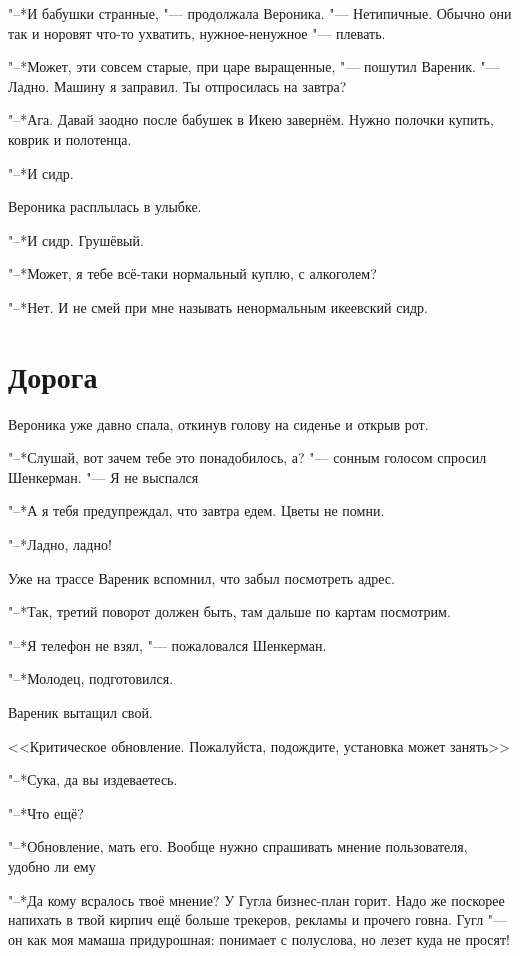 "--*И бабушки странные, "--- продолжала Вероника.
"--- Нетипичные.
Обычно они так и норовят что-то ухватить, нужное-ненужное "--- плевать.

"--*Может, эти совсем старые, при царе выращенные, "--- пошутил Вареник.
"--- Ладно.
Машину я заправил.
Ты отпросилась на завтра?

"--*Ага.
Давай заодно после бабушек в Икею завернём.
Нужно полочки купить, коврик и полотенца.

"--*И сидр.

Вероника расплылась в улыбке.

"--*И сидр.
Грушёвый.

"--*Может, я тебе всё-таки нормальный куплю, с алкоголем?

"--*Нет.
И не смей при мне называть ненормальным икеевский сидр.

\section{Дорога}

Вероника уже давно спала, откинув голову на сиденье и открыв рот.

"--*Слушай, вот зачем тебе это понадобилось, а? "--- сонным голосом спросил Шенкерман.
"--- Я не выспался\ldotst

"--*А я тебя предупреждал, что завтра едем.
Цветы не помни.

"--*Ладно, ладно!

Уже на трассе Вареник вспомнил, что забыл посмотреть адрес.

"--*Так, третий поворот должен быть, там дальше по картам посмотрим.

"--*Я телефон не взял, "--- пожаловался Шенкерман.

"--*Молодец, подготовился.

Вареник вытащил свой.

<<Критическое обновление.
Пожалуйста, подождите, установка может занять\ldotst>>

"--*Сука, да вы издеваетесь.

"--*Что ещё?

"--*Обновление, мать его.
Вообще нужно спрашивать мнение пользователя, удобно ли ему\ldotst

"--*Да кому всралось твоё мнение?
У Гугла бизнес-план горит.
Надо же поскорее напихать в твой кирпич ещё больше трекеров, рекламы и прочего говна.
Гугл "--- он как моя мамаша придурошная: понимает с полуслова, но лезет куда не просят!

